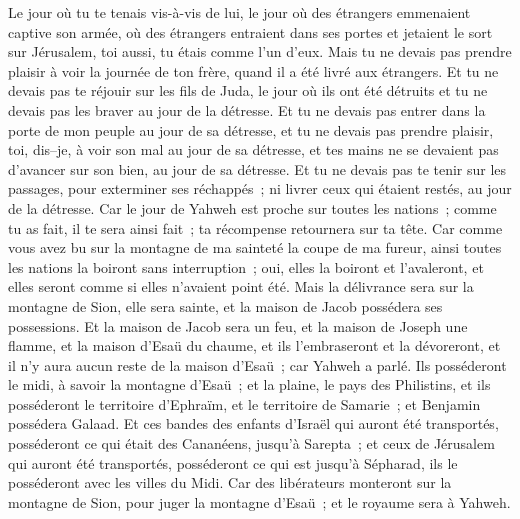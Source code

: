 \begin{multicols}{2}
Le jour où tu te tenais vis-à-vis de lui, le jour où des étrangers emmenaient captive son armée, où des étrangers entraient dans ses portes et jetaient le sort sur Jérusalem, toi aussi, tu étais comme l'un d'eux.
Mais tu ne devais pas prendre plaisir à voir la journée de ton frère, quand il a été livré aux étrangers. Et tu ne devais pas te réjouir sur les fils de Juda, le jour où ils ont été détruits et tu ne devais pas les braver au jour de la détresse.
Et tu ne devais pas entrer dans la porte de mon peuple au jour de sa détresse, et tu ne devais pas prendre plaisir, toi, dis–je, à voir son mal au jour de sa détresse, et tes mains ne se devaient pas d'avancer sur son bien, au jour de sa détresse.
Et tu ne devais pas te tenir sur les passages, pour exterminer ses réchappés~; ni livrer ceux qui étaient restés, au jour de la détresse.
Car le jour de Yahweh est proche sur toutes les nations~; comme tu as fait, il te sera ainsi fait~; ta récompense retournera sur ta tête.
Car comme vous avez bu sur la montagne de ma sainteté la coupe de ma fureur, ainsi toutes les nations la boiront sans interruption~; oui, elles la boiront et l'avaleront, et elles seront comme si elles n'avaient point été.
Mais la délivrance sera sur la montagne de Sion, elle sera sainte, et la maison de Jacob possédera ses possessions.
Et la maison de Jacob sera un feu, et la maison de Joseph une flamme, et la maison d'Esaü du chaume, et ils l'embraseront et la dévoreront, et il n'y aura aucun reste de la maison d'Esaü~; car Yahweh a parlé.
Ils posséderont le midi, à savoir la montagne d'Esaü~; et la plaine, le pays des Philistins, et ils posséderont le territoire d'Ephraïm, et le territoire de Samarie~; et Benjamin possédera Galaad.
Et ces bandes des enfants d'Israël qui auront été transportés, posséderont ce qui était des Cananéens, jusqu'à Sarepta~; et ceux de Jérusalem qui auront été transportés, posséderont ce qui est jusqu'à Sépharad, ils le posséderont avec les villes du Midi.
Car des libérateurs monteront sur la montagne de Sion, pour juger la montagne d'Esaü~; et le royaume sera à Yahweh.
\PPE{}
\end{multicols}
